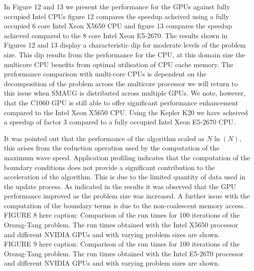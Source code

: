 \documentclass[final,1p]{elsarticle}
\begin{document}
In Figure 12 and 13 we present  the performance for the GPUs against fully occupied Intel CPUs figure 12 compares the speedup acheived using a fully occupied 6 core Intel Xeon X5650 CPU and figure 13 compares the speedup achieved compared to the 8 core Intel Xeon E5-2670. The results shown in Figures 12 and 13 display a characteristic dip for moderate levels of the problem size. This dip results from the performance for the CPU, at this domain size the multicore CPU benefits from optimal utilisation of CPU cache memory. The performance comparison with multi-core CPUs is dependent on the decomposition of the problem across the multicore processor we will return to this issue when SMAUG is distributed across multiple GPUs. We note, however, that the C1060 GPU is still able to offer significant performance enhancement compared to the Intel Xeon X5650 CPU. Using the Kepler K20 we have acheived a speedup of factor 3 compared to a fully occupied Intel Xeon E5-2670 CPU.

It was pointed out that the performance of the algorithm scaled as $N\ln{(N)}$, this arises from the reduction operation used by the computation of the maximum wave speed. Application profiling indicates that the computation of the boundary conditions does not provide a significant contribution to the acceleration of the algorithm. This is due to the limited quantity of data used in the update process. As indicated in the results it was observed that the GPU performance improved as the problem size was increased. A further issue with the computation of the boundary terms is due to the non-coalescent memory access.\\


FIGURE 8 here caption: Comparison of the run times for 100 iterations of the Orszag-Tang problem. The run times obtained with the Intel X5650 processor and different NVIDIA GPUs and with varying problem sizes are shown.\\




FIGURE 9 here caption: Comparison of the run times for 100 iterations of the Orszag-Tang problem. The run times obtained with the Intel E5-2670 processor and different NVIDIA GPUs and with varying problem sizes are shown.\\
\end{document}

